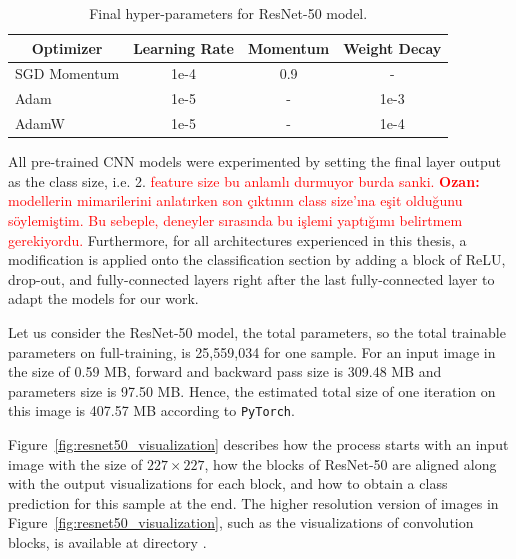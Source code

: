 \begin{table}[h]
	\centering
	\caption{Final hyper-parameters for ResNet-50 model.}
	\label{tab:cnn_hyperparameters}
	\begin{tabular}{lccc}
		\hline 
		\multicolumn{1}{c}{\textbf{Optimizer}} & \textbf{Learning Rate} & \textbf{Momentum} & \textbf{Weight Decay} \\ \hline \hline
		SGD Momentum                           & 1e-4                   & 0.9               & -                     \\ 
		Adam                                   & 1e-5                   & -                 & 1e-3                     \\ 
		AdamW                                  & 1e-5                   & -                 & 1e-4   \\  \hline              
	\end{tabular}
\end{table}

All pre-trained CNN models were experimented by setting the final layer output as the class size, i.e. 2. \textcolor{red}{feature size bu anlamlı durmuyor burda sanki. \textbf{Ozan:} modellerin mimarilerini anlatırken son çıktının class size'ına eşit olduğunu söylemiştim. Bu sebeple, deneyler sırasında bu işlemi yaptığımı belirtmem gerekiyordu.} Furthermore, for all architectures experienced in this thesis,  a modification is applied onto the classification section by adding a block of ReLU, drop-out, and fully-connected layers right after the last fully-connected layer to adapt the models for our work.

Let us consider the ResNet-50 model, the total parameters, so the total trainable parameters on full-training, is 25,559,034 for one sample. For an input image in the size of 0.59 MB, forward and backward pass size is 309.48 MB and parameters size is 97.50 MB. Hence, the estimated total size of one iteration on this image is 407.57 MB according to \verb|PyTorch|.

Figure~\ref{fig:resnet50_visualization} describes how the process starts with an input image with the size of $227 \times 227$, how the blocks of ResNet-50 are aligned along with the output visualizations for each block, and how to obtain a class prediction for this sample at the end. The higher resolution version of images in Figure~\ref{fig:resnet50_visualization}, such as the visualizations of convolution blocks, is available at directory \textcolor{blue}{}.


